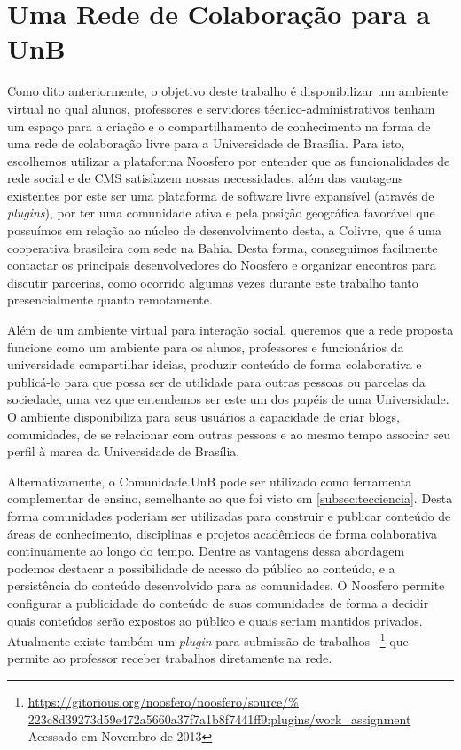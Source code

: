 \chapter{Uma Rede de Colaboração para a UnB}

Como dito anteriormente, o objetivo deste trabalho é disponibilizar um ambiente
virtual no qual alunos, professores e servidores técnico-administrativos tenham 
um espaço para a criação e o compartilhamento de conhecimento na forma de uma
rede de colaboração livre para a Universidade de Brasília.
%
Para isto, escolhemos utilizar a plataforma Noosfero por entender que
as funcionalidades de rede social e de CMS satisfazem nossas necessidades, além
das vantagens existentes por este ser uma plataforma de software
livre expansível (através de \textit{plugins}), por ter uma comunidade
ativa e pela posição geográfica favorável que possuímos em relação ao núcleo de
desenvolvimento desta, a Colivre, que é uma cooperativa brasileira com sede na
Bahia.
%
Desta forma, conseguimos facilmente contactar os principais desenvolvedores
do Noosfero e organizar encontros para discutir parcerias, como ocorrido
algumas vezes durante este trabalho tanto presencialmente quanto remotamente.

Além de um ambiente virtual para interação social, queremos que a rede proposta
funcione como um ambiente para os alunos, professores e funcionários da
universidade compartilhar ideias, produzir conteúdo de forma colaborativa e
publicá-lo para que possa ser de utilidade para outras pessoas ou parcelas da
sociedade, uma vez que entendemos ser este um dos papéis de uma Universidade.
%
O ambiente disponibiliza para seus usuários a capacidade de criar blogs,
comunidades, de se relacionar com outras pessoas e ao mesmo tempo associar seu
perfil à marca da Universidade de Brasília.

Alternativamente, o Comunidade.UnB pode ser utilizado como ferramenta
complementar de ensino, semelhante ao que foi visto em \ref{subsec:tecciencia}.
%
Desta forma comunidades poderiam ser utilizadas para construir e publicar
conteúdo de áreas de conhecimento, disciplinas e projetos acadêmicos de forma
colaborativa continuamente ao longo do tempo. Dentre as vantagens dessa
abordagem podemos destacar a possibilidade de acesso do público ao conteúdo, e a
persistência do conteúdo desenvolvido para as comunidades. O Noosfero permite
configurar a publicidade do conteúdo de suas comunidades de forma a decidir
quais conteúdos serão expostos ao público e quais seriam mantidos privados.
%
Atualmente existe também um \textit{plugin} para submissão de trabalhos
~\footnote{\url{https://gitorious.org/noosfero/noosfero/source/%
223c8d39273d59e472a5660a37f7a1b8f7441ff9:plugins/work_assignment}
Acessado em Novembro de 2013} que permite ao professor receber trabalhos diretamente
na rede.

